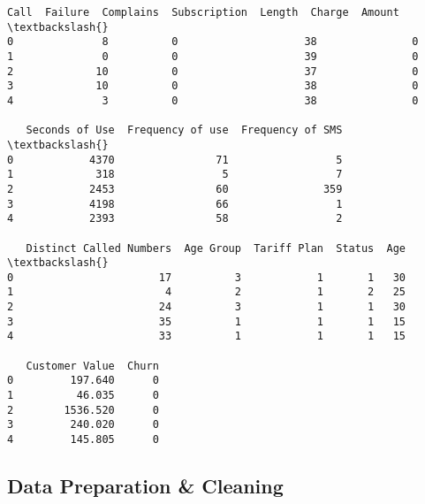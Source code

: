 \documentclass[11pt]{article}
\makeatletter
\newcommand{\boxspacing}{\kern\kvtcb@left@rule\kern\kvtcb@boxsep}
\newcommand{\prompt}[4]{
        {\ttfamily\llap{{\color{#2}[#3]:\hspace{3pt}#4}}\vspace{-\baselineskip}}
    }
\makeatother
\begin{document}
            \begin{tcolorbox}[breakable, size=fbox, boxrule=.5pt, pad at break*=1mm, opacityfill=0]
\prompt{Out}{outcolor}{38}{\boxspacing}
\begin{Verbatim}[commandchars=\\\{\}]
   Call  Failure  Complains  Subscription  Length  Charge  Amount  \textbackslash{}
0              8          0                    38               0
1              0          0                    39               0
2             10          0                    37               0
3             10          0                    38               0
4              3          0                    38               0

   Seconds of Use  Frequency of use  Frequency of SMS  \textbackslash{}
0            4370                71                 5
1             318                 5                 7
2            2453                60               359
3            4198                66                 1
4            2393                58                 2

   Distinct Called Numbers  Age Group  Tariff Plan  Status  Age  \textbackslash{}
0                       17          3            1       1   30
1                        4          2            1       2   25
2                       24          3            1       1   30
3                       35          1            1       1   15
4                       33          1            1       1   15

   Customer Value  Churn
0         197.640      0
1          46.035      0
2        1536.520      0
3         240.020      0
4         145.805      0
\end{Verbatim}
\end{tcolorbox}
        
    \subsection{Data Preparation \&
Cleaning}\label{data-preparation-cleaning}
\end{document}
